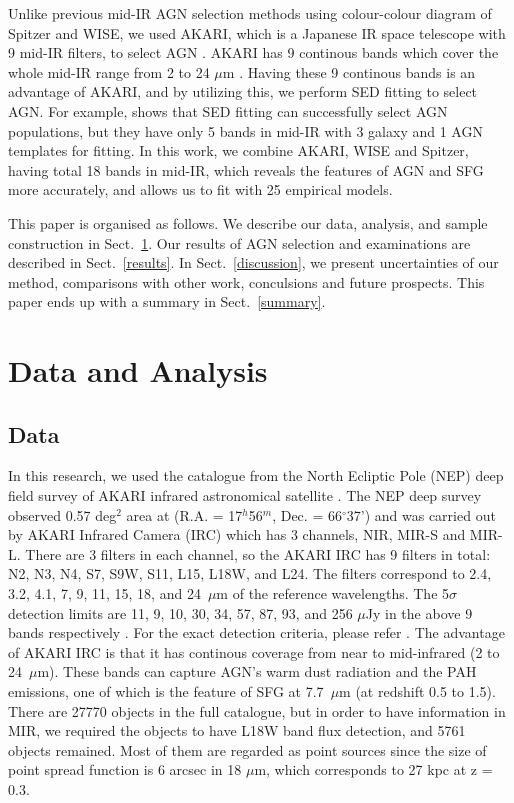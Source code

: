 \documentclass[a4paper,fleqn,usenatbib]{mnras}
\begin{document}
Unlike previous mid-IR AGN selection methods using colour-colour diagram of Spitzer and WISE, we used AKARI, which is a Japanese IR space telescope with 9 mid-IR filters, to select AGN \citep{Murakami et al. 2007}. AKARI has 9 continous bands which cover the whole mid-IR range from 2 to 24 $\mu$m \citep{Matsuhara et al. 2006}. Having these 9 continous bands is an advantage of AKARI, and by utilizing this, we perform SED fitting to select AGN. For example, \citet{Chung et al. 2014} shows that SED fitting can successfully select AGN populations, but they have only 5 bands in mid-IR with 3 galaxy and 1 AGN templates for fitting. In this work, we combine AKARI, WISE and Spitzer, having total 18 bands in mid-IR, which reveals the features of AGN and SFG more accurately, and allows us to fit with 25 empirical models.  

This paper is organised as follows. We describe our data, analysis, and sample construction in Sect.~\ref{sec:DandA}. Our results of AGN selection and examinations are described in Sect.~\ref{results}. In Sect.~\ref{discussion}, we present uncertainties of our method, comparisons with other work, conculsions and future prospects. This paper ends up with a summary in Sect.~\ref{summary}. 





\section{Data and Analysis}  
\label{sec:DandA}
\subsection{Data}
\label{sec:datas} %



In this research, we used the catalogue from the North Ecliptic Pole (NEP) deep field survey of AKARI infrared astronomical satellite \citep{Takagi et al. 2012,Murata et al. 2013}. The NEP deep survey observed 0.57 deg$^2$ area at (R.A. = 17$^h$56$^m$, Dec. = 66$^\circ$37') and was carried out by AKARI Infrared Camera (IRC) which has 3 channels, NIR, MIR-S and MIR-L. There are 3 filters in each channel, so the AKARI IRC has 9 filters in total: N2, N3, N4, S7, S9W, S11, L15, L18W, and L24. The filters correspond to 2.4, 3.2, 4.1, 7, 9, 11, 15, 18, and 24~$\mu$m of the reference wavelengths. The 5$\sigma$ detection limits are 11, 9, 10, 30, 34, 57, 87, 93, and 256 $\mu$Jy in the above 9 bands respectively \citep{Murata et al. 2013}. For the exact detection criteria, please refer \citet{Murata et al. 2013}. The advantage of AKARI IRC is that it has continous coverage from near to mid-infrared (2 to 24~$\mu$m). These bands can capture AGN's warm dust radiation and the PAH emissions, one of which is the feature of SFG at 7.7~$\mu$m (at redshift 0.5 to 1.5). There are 27770 objects in the full catalogue, but in order to have information in MIR, we required the objects to have L18W band flux detection, and 5761 objects remained. Most of them are regarded as point sources since the size of point spread function is 6 arcsec in 18 $\mu$m, which corresponds to 27 kpc at z = 0.3.
\end{document}
